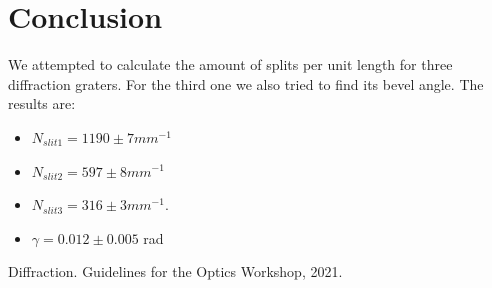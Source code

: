 \documentclass[a4paper, 12pt]{article}
\begin{document}
	\section*{Conclusion}
	We attempted to calculate the amount of splits per unit length for three diffraction graters. For the third one we also tried to find its bevel angle. The results are:
	\begin{itemize}
		\item $N_{slit1} = 1190 \pm 7 mm^{-1}$
		\item $N_{slit2} = 597 \pm 8 mm^{-1}$
		\item $N_{slit3} = 316 \pm 3 mm^{-1}$.
		\item $\gamma = 0.012 \pm 0.005$ rad
	\end{itemize}
	\begin{thebibliography}{9}
		Diffraction.
		Guidelines for the Optics Workshop, 2021.
	\end{thebibliography}
\end{document}
